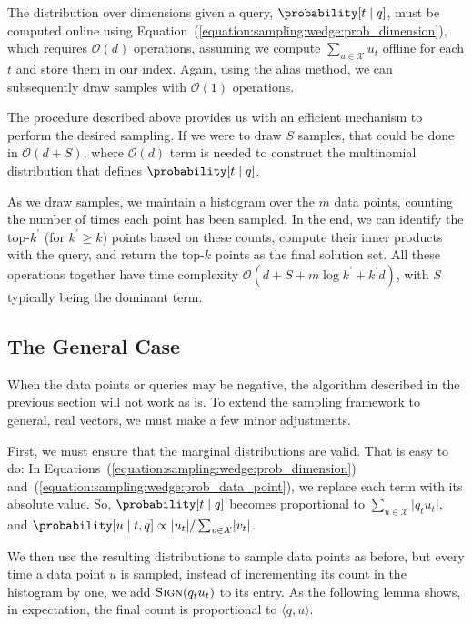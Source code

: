 The distribution over dimensions given a query, $\probability[t \;|\; q]$,
must be computed online using Equation~(\ref{equation:sampling:wedge:prob_dimension}),
which requires $\mathcal{O}(d)$ operations, assuming we compute $\sum_{u \in \mathcal{X}} u_t$
offline for each $t$ and store them in our index. Again, using the alias method,
we can subsequently draw samples with $\mathcal{O}(1)$ operations.

The procedure described above provides us with an efficient mechanism to
perform the desired sampling. If we were to draw $S$ samples, that could be done
in $\mathcal{O}(d + S)$, where $\mathcal{O}(d)$ term is needed to construct the
multinomial distribution that defines $\probability[t \;|\; q]$.

As we draw samples, we maintain a histogram over the $m$ data points, counting
the number of times each point has been sampled. In the end, we can identify the
top-$k^\prime$ (for $k^\prime \geq k$) points based on these counts, compute their
inner products with the query, and return the top-$k$ points as the final solution set.
All these operations together have time complexity
$\mathcal{O}(d + S + m \log k^\prime + k^\prime d)$, with $S$ typically being
the dominant term.

\subsection{The General Case}
When the data points or queries may be negative, the algorithm described in the
previous section will not work as is. To extend the sampling framework to general,
real vectors, we must make a few minor adjustments.

First, we must ensure that the marginal distributions are valid.
That is easy to do: In Equations~(\ref{equation:sampling:wedge:prob_dimension})
and~(\ref{equation:sampling:wedge:prob_data_point}), we replace each term
with its absolute value. So, $\probability[t \;|\; q]$ becomes proportional to
$\sum_{u \in \mathcal{X}} \lvert q_t u_t \rvert$, and 
$\probability[u \;|\; t, q] \propto \lvert u_t \rvert / \sum_{v \in \mathcal{X}} \lvert v_t \rvert$.

We then use the resulting distributions to sample data points as before,
but every time a data point $u$ is sampled, instead of incrementing its count in the
histogram by one, we add $\textsc{Sign}(q_t u_t)$ to its entry. As the following lemma
shows, in expectation, the final count is proportional to $\langle q, u \rangle$.

